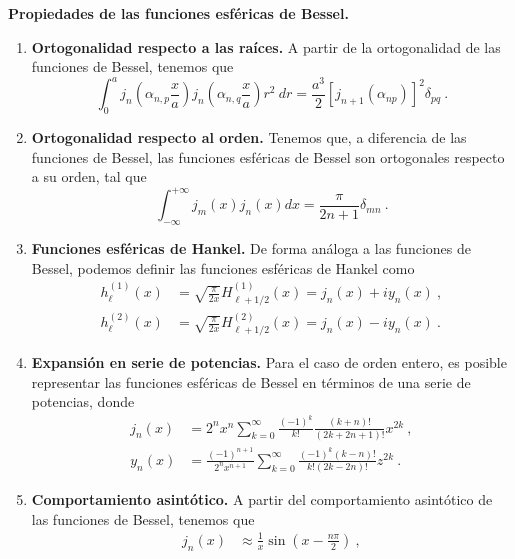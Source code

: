\begin{propiedad}
    \textbf{Propiedades de las funciones esféricas de Bessel.}

    \begin{enumerate}
        \item \textbf{Ortogonalidad respecto a las raíces.} A partir de la ortogonalidad de las funciones de Bessel, tenemos que
        \begin{equation}
            \int_0^a j_n\left( \alpha_{n,p} \frac{x}{a} \right) j_n\left( \alpha_{n,q} \frac{x}{a}  \right) r^2 \ dr = \frac{a^3}{2} \left[ j_{n+1}(\alpha_{np}) \right]^2 \delta_{pq} \ .
        \end{equation}
        \item \textbf{Ortogonalidad respecto al orden.} Tenemos que, a diferencia de las funciones de Bessel, las funciones esféricas de Bessel son ortogonales respecto a su orden, tal que
        \begin{equation}
            \int_{-\infty}^{+\infty} j_m(x) j_n(x) dx = \frac{\pi}{2n+1} \delta_{mn} \ .
        \end{equation}
        \item \textbf{Funciones esféricas de Hankel.} De forma análoga a las funciones de Bessel, podemos definir las funciones esféricas de Hankel como
        \begin{align}
            h_\ell^{(1)}(x) & = \sqrt{\frac{\pi}{2x}}H_{\ell + 1/2}^{(1)}(x) = j_n(x) + i y_n(x) \ , \\
            h_\ell^{(2)}(x) & = \sqrt{\frac{\pi}{2x}}H_{\ell + 1/2}^{(2)}(x) = j_n(x) - i y_n(x) \ .
        \end{align}
        \item \textbf{Expansión en serie de potencias.} Para el caso de orden entero, es posible representar las funciones esféricas de Bessel en términos de una serie de potencias, donde
        \begin{align}
            j_n(x) & = 2^n x^n  \sum_{k=0}^\infty \frac{(-1)^k}{k!} \frac{(k+n)!}{(2k+2n+1)!}x^{2k} \ , \\
            y_n(x) & = \frac{(-1)^{n+1}}{2^n x^{n+1}} \sum_{k = 0}^\infty \frac{(-1)^k (k-n)!}{k! (2k-2n)!}z^{2k} \ .
        \end{align}
        \item \textbf{Comportamiento asintótico.} A partir del comportamiento asintótico de las funciones de Bessel, tenemos que
        \begin{align}
            j_n(x) & \approx \frac{1}{x} \sin\left( x - \frac{n\pi}{2} \right) \ , \\

\end{align}
\end{enumerate}
\end{propiedad}
